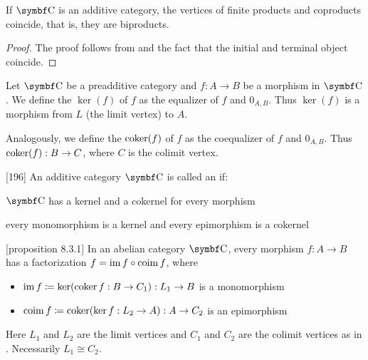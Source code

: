 \begin{theorem}\label{thm:additive_category_biproducts}
  If \( \Cat{C} \) is an additive category, the vertices of finite products and coproducts coincide, that is, they are biproducts.
\end{theorem}
\begin{proof}
  The proof follows from  and the fact that the initial and terminal object coincide.
\end{proof}

\begin{definition}\label{def:categorical_kernel}
  Let \( \Cat{C} \) be a preadditive category and \( f: A \to B \) be a morphism in \( \Cat{C} \). We define the  \( \ker(f) \) of \( f \) as the equalizer of \( f \) and \( 0_{A,B} \). Thus \( \ker(f) \) is a morphism from \( L \) (the limit vertex) to \( A \).

  Analogously, we define the  \( \operatorname{co}\!\ker(f) \) of \( f \) as the coequalizer of \( f \) and \( 0_{A,B} \). Thus \( \operatorname{co}\!\ker(f): B \to C \), where \( C \) is the colimit vertex.
\end{definition}

\begin{definition}\label{def:abelian_category}\cite{MacLane1994}[196]
  An additive category \( \Cat{C} \) is called an  if:
  \begin{defenum}
    \item \( \Cat{C} \) has a kernel and a cokernel for every morphism
    \item every monomorphism is a kernel and every epimorphism is a cokernel
  \end{defenum}
\end{definition}

\begin{proposition}\label{def:abelian_category_morphism_factorization}\cite{MacLane1994}[proposition 8.3.1]
  In an abelian category \( \Cat{C} \), every morphism \( f: A \to B \) has a factorization \( f = \operatorname{im} f \circ \operatorname{co}\!\operatorname{im} f \), where
  \begin{itemize}
    \item \( \operatorname{im} f \coloneqq \ker(\operatorname{co}\!\ker f: B \to C_1): L_1 \to B \) is a monomorphism
    \item \( \operatorname{co}\!\operatorname{im} f \coloneqq \operatorname{co}\!\ker(\ker f: L_2 \to A): A \to C_2 \) is an epimorphism
  \end{itemize}
  Here \( L_1 \) and \( L_2 \) are the limit vertices and \( C_1 \) and \( C_2 \) are the colimit vertices as in . Necessarily \( L_1 \cong C_2 \).
\end{proposition}

